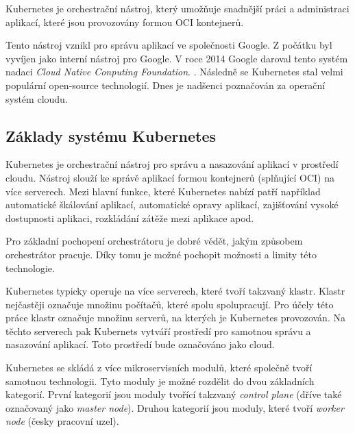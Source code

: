 Kubernetes je orchestrační nástroj, který umožňuje snadnější práci a administraci aplikací, které jsou provozovány formou OCI kontejnerů.

Tento nástroj vznikl pro správu aplikací ve společnosti Google. Z počátku byl vyvíjen jako interní nástroj pro Google. V roce 2014 Google daroval tento systém nadaci \textit{Cloud Native Conputing Foundation}. \cite{poulton_2022_the}. Následně se Kubernetes stal velmi populární open-source technologií. Dnes je nadšenci poznačován za operační systém cloudu. \cite{poulton_2022_the}%


\subsection{Základy systému Kubernetes}

Kubernetes je orchestrační nástroj pro správu a nasazování aplikací v prostředí cloudu. Nástroj slouží ke správě aplikací formou kontejnerů (splňující OCI) na více serverech. Mezi hlavní funkce, které Kubernetes nabízí patří například automatické škálování aplikací, automatické opravy aplikací, zajišťování vysoké dostupnosti aplikaci, rozkládání zátěže mezi aplikace apod. \cite{nassimkebbani_2022_the}

Pro základní pochopení orchestrátoru je dobré vědět, jakým způsobem orchestrátor pracuje. Díky tomu je možné pochopit možnosti a limity této technologie.

Kubernetes typicky operuje na více serverech, které tvoří takzvaný klastr. Klastr nejčastěji označuje množinu počítačů, které spolu spolupracují. Pro účely této práce klastr označuje množinu serverů, na kterých je Kubernetes provozován. Na těchto serverech pak Kubernets vytváří prostředí pro samotnou správu a nasazování aplikací. Toto prostředí bude označováno jako cloud.

Kubernetes se skládá z více mikroservisních modulů, které společně tvoří samotnou technologii. Tyto moduly je možné rozdělit do dvou základních kategorií. První kategorií jsou moduly tvořící takzvaný \textit{control plane} (dříve také označovaný jako \textit{master node}). Druhou kategorií jsou moduly, které tvoří \textit{worker node} (česky pracovní uzel).

